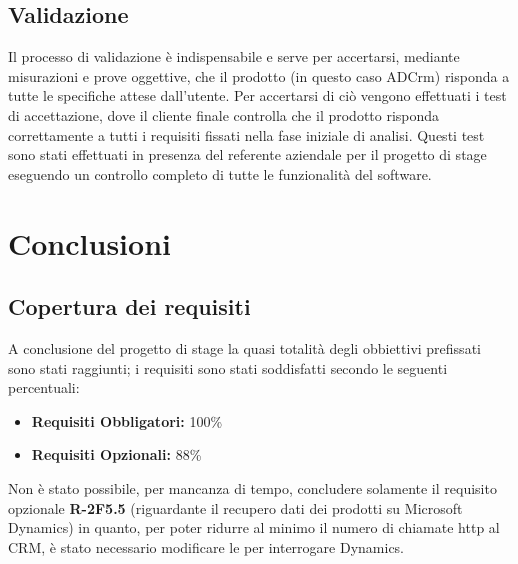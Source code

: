 \documentclass[12pt,a4paper,twoside,openany,english]{book}
\begin{document}
\section{Validazione}
Il processo di validazione è indispensabile e serve per accertarsi, mediante misurazioni e prove oggettive, che il prodotto (in questo caso ADCrm) risponda a tutte le specifiche attese dall'utente.
Per accertarsi di ciò vengono effettuati i test di accettazione, dove il cliente finale controlla che il prodotto risponda correttamente a tutti i requisiti fissati nella fase iniziale di analisi.
Questi test sono stati effettuati in presenza del referente aziendale per il progetto di stage eseguendo un controllo completo di tutte le funzionalità del software.


\chapter{Conclusioni}\label{conclusioni}
\section{Copertura dei requisiti}
A conclusione del progetto di stage la quasi totalità degli obbiettivi prefissati sono stati raggiunti; i requisiti sono stati soddisfatti secondo le seguenti percentuali:
\begin{itemize}
	\item \textbf{Requisiti Obbligatori:} 100\%
	\item \textbf{Requisiti Opzionali:} 88\%
\end{itemize}
Non è stato possibile, per mancanza di tempo, concludere solamente il requisito opzionale \textbf{R-2F5.5} (riguardante il recupero dati dei prodotti su Microsoft Dynamics) in quanto, per poter ridurre al minimo il numero di chiamate \gls{http} al \gls{CRM}, è stato necessario modificare le  per interrogare Dynamics.
\end{document}

